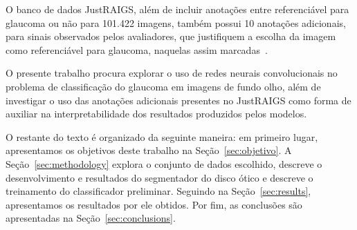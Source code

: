 \documentclass[12pt]{article}
\begin{document}
O banco de dados JustRAIGS, além de incluir anotações entre referenciável para glaucoma ou não para 101.422 imagens, também possui 10 anotações adicionais, para sinais observados pelos avaliadores, que justifiquem a escolha da imagem como referenciável para glaucoma, naquelas assim marcadas~\cite{justraigs_article}.

O presente trabalho procura explorar o uso de redes neurais convolucionais no problema de classificação do glaucoma em imagens de fundo olho, além de investigar o uso das anotações adicionais presentes no JustRAIGS como forma de auxiliar na interpretabilidade dos resultados produzidos pelos modelos.

O restante do texto é organizado da seguinte maneira: em primeiro lugar, apresentamos os objetivos deste trabalho na Seção~\ref{sec:objetivo}. A Seção~\ref{sec:methodology} explora o conjunto de dados escolhido, descreve o desenvolvimento e resultados do segmentador do disco ótico e descreve o treinamento do classificador preliminar. Seguindo na Seção~\ref{sec:results}, apresentamos os resultados por ele obtidos. Por fim, as conclusões são apresentadas na Seção~\ref{sec:conclusions}.

\end{document}
